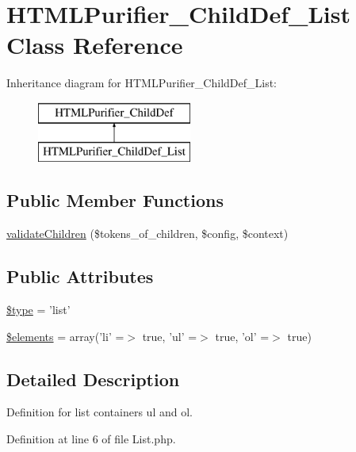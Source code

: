 \hypertarget{classHTMLPurifier__ChildDef__List}{\section{H\+T\+M\+L\+Purifier\+\_\+\+Child\+Def\+\_\+\+List Class Reference}
\label{classHTMLPurifier__ChildDef__List}
}
Inheritance diagram for H\+T\+M\+L\+Purifier\+\_\+\+Child\+Def\+\_\+\+List\+:\begin{figure}[H]
\begin{center}
\leavevmode
\includegraphics[height=2.000000cm]{classHTMLPurifier__ChildDef__List}
\end{center}
\end{figure}
\subsection*{Public Member Functions}
\begin{DoxyCompactItemize}
\item 
\hyperlink{classHTMLPurifier__ChildDef__List_aa404ead65278c33c7789d18a633dbd60}{validate\+Children} (\$tokens\+\_\+of\+\_\+children, \$config, \$context)
\end{DoxyCompactItemize}
\subsection*{Public Attributes}
\begin{DoxyCompactItemize}
\item 
\hyperlink{classHTMLPurifier__ChildDef__List_a6fb97080d80dd11dbe41abdf1d06009c}{\$type} = 'list'
\item 
\hyperlink{classHTMLPurifier__ChildDef__List_a92ce6abbf82d46c1a37b4743fcdd4cd3}{\$elements} = array('li' =$>$ true, 'ul' =$>$ true, 'ol' =$>$ true)
\end{DoxyCompactItemize}


\subsection{Detailed Description}
Definition for list containers ul and ol. 

Definition at line 6 of file List.\+php.



